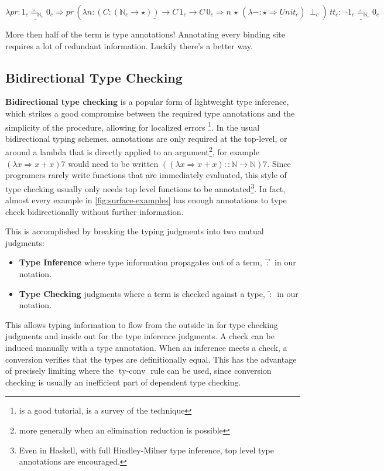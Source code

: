 $\lambda pr\underline{:1_{c}\doteq_{\mathbb{N}_{c}}0_{c}}\Rightarrow pr\,\left(\lambda n:\underline{\left(C:\left(\mathbb{N}_{c}\rightarrow\star\right)\right)\rightarrow C\,1_{c}\rightarrow C\,0_{c}}\Rightarrow n\,\star\,(\lambda-:\underline{\star\Rightarrow Unit_{c}})\,\perp_{c}\right)\,tt_{c}:\underline{\lnot1_{c}\doteq_{\mathbb{N}_{c}}0_{c}}$

More then half of the term is type annotations! Annotating every binding site requires a lot of redundant information.
Luckily there's a better way.

\subsection{Bidirectional Type Checking}

\textbf{Bidirectional type checking} is a popular form of lightweight type inference, which strikes a good compromise between the required type annotations and the simplicity of the procedure, allowing for localized errors \footnote{\cite{christiansen2013bidirectional} is a good tutorial, \cite{10.1145/3450952} is a survey of the technique}.
In the usual bidirectional typing schemes, annotations are only required at the top-level, or around a lambda that is directly applied to an argument\footnote{more generally when an elimination reduction is possible}, for example $(\lambda x\Rightarrow x+x)7$ would need to be written $\left((\lambda x\Rightarrow x+x)::\mathbb{N}\rightarrow\mathbb{N}\right)7$.
Since programers rarely write functions that are immediately evaluated, this style of type checking usually only needs top level functions to be annotated\footnote{Even in Haskell, with full Hindley-Milner type inference, top level type annotations are encouraged.}.
In fact, almost every example in \ref{fig:surface-examples} has enough annotations to type check bidirectionally without further information.


This is accomplished by breaking the typing judgments into two mutual judgments:
\begin{itemize}
\item \textbf{Type Inference} where type information propagates out of a
term, $\overrightarrow{\,:\,}$ in our notation. 
\item \textbf{Type Checking} judgments where a term is checked against a
type, $\overleftarrow{\,:\,}$ in our notation. 
\end{itemize}
This allows typing information to flow from the outside in for type checking judgments and inside out for the type inference judgments.
A check can be induced manually with a type annotation.
When an inference meets a check, a conversion verifies that the types are definitionally equal.
This has the advantage of precisely limiting where the $\operatorname{ty-conv}$ rule can be used, since conversion checking is usually an inefficient part of dependent type checking.

